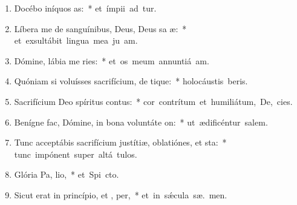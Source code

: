 \begin{flushleft}
\begin{enumerate}[leftmargin=*]
\item Docébo iníquos  as:~* \mbox{et ímpii ad  tur.}
\item Líbera me de sanguínibus, Deus, Deus sa æ:~* \mbox{et exsultábit lingua mea ju am.}
\item Dómine, lábia me ries:~* \mbox{et os meum annuntiá  am.}
\item Quóniam si voluísses sacrifícium, de tique:~* \mbox{holocáustis  beris.}
\item Sacrifícium Deo spíritus contus:~* \mbox{cor contrítum et humiliátum, De,  cies.}
\item Benígne fac, Dómine, in bona voluntáte  on:~* \mbox{ut ædificéntur  salem.}
\item Tunc acceptábis sacrifícium justítiæ, oblatiónes, et sta:~* \mbox{tunc impónent super altá  tulos.}
\item Glória Pa,  lio,~* \mbox{et Spi cto.}
\item Sicut erat in princípio, et ,  per,~* \mbox{et in s\'{\ae}cula sæ. men.}

\end{enumerate}
\end{flushleft}

